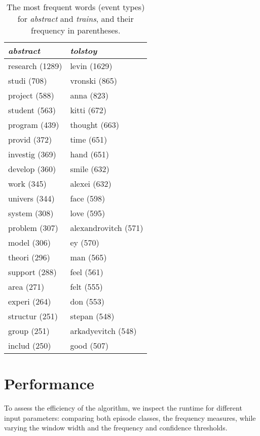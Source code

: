 \begin{table}
\centering

\begin{tabulary}{\textwidth}{L|L}

\emph{abstract} & \emph{tolstoy} \\
\hline
research    (1289) & levin (1629) \\
studi   (708) & vronski (865) \\
project (588) & anna (823) \\
student (563) & kitti (672) \\
program (439) & thought (663) \\
provid  (372) & time (651) \\
investig    (369) & hand (651) \\
develop (360) & smile (632) \\
work    (345) & alexei (632) \\
univers (344) & face (598) \\
system  (308) & love (595) \\
problem (307) & alexandrovitch (571) \\
model   (306) & ey (570) \\
theori  (296) & man (565) \\
support (288) & feel (561) \\
area    (271) & felt (555) \\
experi  (264) & don (553) \\
structur    (251) & stepan (548) \\
group   (251) & arkadyevitch (548) \\
includ  (250) & good (507) \\

\end{tabulary}

\caption{The most frequent words (event types) for \emph{abstract} and \emph{trains}, and their frequency in parentheses.}
\label{table:most-frequent-event-types}
\end{table}

\section{Performance}

To assess the efficiency of the algorithm, we inspect the runtime for different input parameters: comparing both episode classes, the frequency measures, while varying the window width and the frequency and confidence thresholds.

